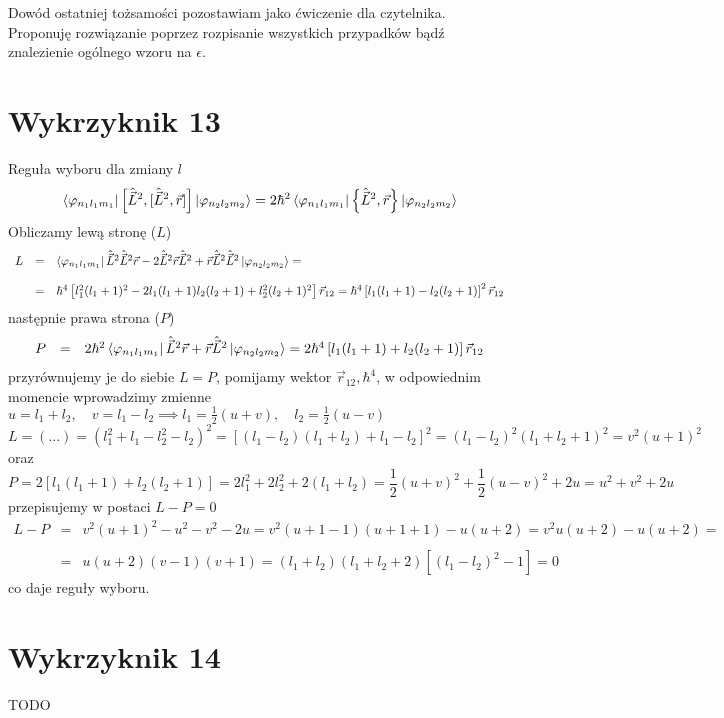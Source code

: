 \documentclass[a4paper,12pt]{article}
\begin{document}
Dowód ostatniej tożsamości pozostawiam jako ćwiczenie dla czytelnika. Proponuję
rozwiązanie poprzez rozpisanie wszystkich przypadków bądź znalezienie ogólnego
wzoru na $\epsilon$.
\section{Wykrzyknik 13}
Reguła wyboru dla zmiany $l$
$$
	\bra{\varphi_{n_1l_1m_1}}\left[\hat{\vec{L}}^2,[\hat{\vec{L}}^2,\vec{r}]\right]\ket{\varphi_{n_2l_2m_2}} = 2\hbar^2\bra{\varphi_{n_1l_1m_1}}\left\{\hat{\vec{L}}^2,\vec{r}\right\} \ket{\varphi_{n_2l_2m_2}}
$$
Obliczamy lewą stronę ($L$)
$$
\begin{array}{lll}
	L &=& \bra{\varphi_{n_1l_1m_1}} \hat{\vec{L}}^2 \hat{\vec{L}}^2\vec{r}- 2\hat{\vec{L}}^2\vec{r}\hat{\vec{L}}^2+\vec{r}\hat{\vec{L}}^2\hat{\vec{L}}^2\ket{\varphi_{n_2l_2m_2}} =\\\\
	&=& \hbar^4\left[l_1^2(l_1+1)^2-2l_1(l_1+1)l_2(l_2+1)+l_2^2(l_2+1)^2 \right]\vec{r}_{12} = \hbar^4\left[l_1(l_1+1)-l_2(l_2+1)\right]^2\vec{r}_{12}
\end{array}
$$
następnie prawa strona ($P$)
$$
\begin{array}{lll}
	P &=& 2\hbar^2\bra{\varphi_{n_1l_1m_1}}\hat{\vec{L}}^2\vec{r}+\vec{r}\hat{\vec{L}}^2\ket{\varphi_{n_2l_2m_2}} = 2\hbar^4\left[l_1(l_1+1)+l_2(l_2+1)\right]\vec{r}_{12}
\end{array}
$$
przyrównujemy je do siebie $L=P$, pomijamy wektor $\vec{r}_{12}, \hbar^4$, w odpowiednim momencie wprowadzimy zmienne $u = l_1+l_2,\quad v = l_1-l_2\implies l_1=\frac{1}{2}(u+v),\quad l_2 = \frac{1}{2}(u-v)$
$$
	L = (...) = (l_1^2+l_1-l_2^2-l_2)^2 = [(l_1-l_2)(l_1+l_2)+l_1-l_2]^2 = (l_1-l_2)^2 (l_1+l_2+1)^2 = v^2 (u+1)^2
$$
oraz
$$
	P = 2[l_1(l_1+1)+l_2(l_2+1)] = 2l_1^2+2l_2^2+2(l_1+l_2) = \frac{1}{2}(u+v)^2+\frac{1}{2}(u-v)^2+2u = u^2+v^2+2u
$$
przepisujemy w postaci $L-P=0$
$$
\begin{array}{lll}
	L-P &=& v^2(u+1)^2-u^2-v^2-2u = v^2(u+1-1)(u+1+1) - u(u+2) = v^2u(u+2)-u(u+2) =\\\\ &=& u(u+2)(v-1)(v+1) = (l_1+l_2)(l_1+l_2+2)[(l_1-l_2)^2-1] = 0
\end{array}
$$
co daje reguły wyboru.

\section{Wykrzyknik 14}
TODO
\end{document}
